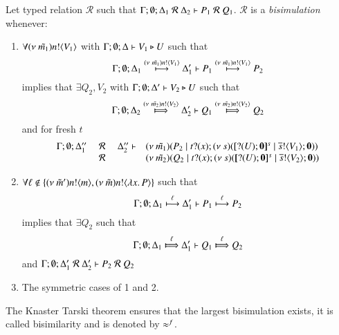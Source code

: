 \begin{definition}[Bisimulation]\rm
	Let typed relation $\mathcal{R}$ such that
	$\horel{\Gamma}{\Delta_1}{P_1}{\ \mathcal{R}\ }{\Delta_2}{Q_1}$.
	$\mathcal{R}$ is a {\em bisimulation} whenever:
	\begin{enumerate}
		\item	$\forall \news{\tilde{m_1}} \bactout{n}{V_1}$ with $\Gamma; \es; \Delta \proves V_1 \hastype U$ such that
			\[
				\horel{\Gamma}{\Delta_1}{P_1}{\hby{\news{\tilde{m_1}} \bactout{n}{V_1}}}{\Delta_1'}{P_2}
			\]
			implies that $\exists Q_2, V_2$ with $\Gamma; \es; \Delta' \proves V_2 \hastype U$ such that
			\[
				\horel{\Gamma}{\Delta_2}{Q_1}{\Hby{\news{\tilde{m_2}} \bactout{n}{V_2}}}{\Delta_2'}{Q_2}
			\]
			and for fresh $t$
			\[
				\mhorel{\Gamma}{\Delta_1''}{\newsp{\tilde{m_1}}{P_2 \Par \fotrigger{t}{x}{s}{\btinp{U} \inact}{V_1}}}
				{\ \mathcal{R}\ }
				{\Delta_2''}{}{\newsp{\tilde{m_2}}{Q_2 \Par \fotrigger{t}{x}{s}{\btinp{U} \inact}{V_2}}}
			\]

		\item	$\forall \ell \notin \set{\news{\tilde{m}'} \bactout{n}{m}, \news{\tilde{m}} \bactout{n}{\abs{x}{P}}}$ such that
			\[
				\horel{\Gamma}{\Delta_1}{P_1}{\hby{\ell}}{\Delta_1'}{P_2}
			\]
			implies that $\exists Q_2$ such that 
			\[
				\horel{\Gamma}{\Delta_1}{Q_1}{\Hby{\ell}}{\Delta_1'}{Q_2}
			\]
			and
			$\horel{\Gamma}{\Delta_1'}{P_2}{\ \mathcal{R}\ }{\Delta_2'}{Q_2}$

		\item	The symmetric cases of 1 and 2.
	\end{enumerate}
	The Knaster Tarski theorem ensures that the largest bisimulation exists,
	it is called bisimilarity and is denoted by $\wb^f$.
\end{definition}


